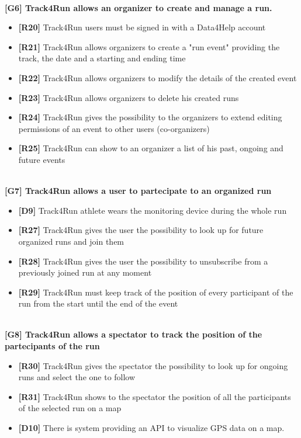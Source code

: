 \\
\textbf{[G6] Track4Run allows an organizer to create and manage a run.}
\begin{itemize}
	\item \textbf{[R20]} Track4Run users must be signed in with a Data4Help account
	\item \textbf{[R21]} Track4Run allows organizers to create a "run event" providing the track, the date and a starting and ending time
	\item \textbf{[R22]}  Track4Run allows organizers to modify the details of the created event
	\item \textbf{[R23]} Track4Run allows organizers to delete his created runs
	\item \textbf{[R24]} Track4Run gives the possibility to the organizers to extend editing permissions of an event to other users (co-organizers) 
	\item \textbf{[R25]} Track4Run can show to an organizer a list of his past, ongoing and future events
\end{itemize}
\\
\textbf{[G7] Track4Run allows a user to partecipate to an organized run}
\begin{itemize}
	\item \textbf{[D9]} Track4Run athlete wears the monitoring device during the whole run
	\item \textbf{[R27]} Track4Run gives the user the possibility to look up for future organized runs and join them
	\item \textbf{[R28]} Track4Run gives the user the possibility to unsubscribe from a previously joined run at any moment
	\item \textbf{[R29]} Track4Run must keep track of the position of every participant of the run from the start until the end of the event
\end{itemize}
\\
\textbf{[G8] Track4Run allows a spectator to track the position of the partecipants of the run}
\begin{itemize}
	\item \textbf{[R30]} Track4Run gives the spectator the possibility to look up for ongoing runs and select the one to follow
	\item \textbf{[R31]} Track4Run shows to the spectator the position of all the participants of the selected run on a map
	\item \textbf{[D10]} There is system providing an API to visualize GPS data on a map.
\end{itemize}
 
